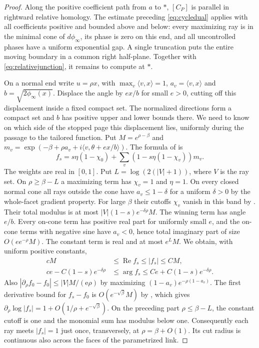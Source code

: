 \begin{proof}
Along the positive coefficient path from $a$ to $*$, $[C_P]$ is parallel in rightward relative homology. The estimate preceding \eqref{eq:cycledual} applies with all coefficients positive and bounded above and below: every maximizing ray is in the minimal cone of $d\phi_\infty$, its phase is zero on this end, and all uncontrolled phases have a uniform exponential gap. A single truncation puts the entire moving boundary in a common right half-plane. Together with \eqref{eq:relativejunction}, it remains to compute at $*$.

On a normal end write $u=\rho x$, with $\max_v\langle v,x\rangle=1$, $a_v=\langle v,x\rangle$ and $b=\sqrt{2\phi_\infty(x)}$. Displace the angle by $ex/b$ for small $e>0$, cutting off this displacement inside a fixed compact set. The normalized directions form a compact set and $b$ has positive upper and lower bounds there. We need to know on which side of the stopped page this displacement lies, uniformly during the passage to the tailored function. Put $M=e^{\rho-\beta}$ and $m_v=\exp(-\beta+\rho a_v+i\langle v,\theta+ex/b\rangle)$. The formula of \cite[M.6]{FHSZ} is
\[
             f_s=s\eta(1-\chi_0)+
                          \sum_v(1-s\eta(1-\chi_v))m_v .
\]
The weights are real in $[0,1]$. Put $L=\log(2(|V|+1))$, where $V$ is the ray set. On $\rho\ge\beta-L$ a maximizing term has $\chi_v=1$ and $\eta=1$. On every closed normal cone all rays outside the cone have $a_v\le1-\delta$ for a uniform $\delta>0$ by the whole-facet gradient property. For large $\beta$ their cutoffs $\chi_v$ vanish in this band by \cite[M.2 and T.5]{FHSZ}. Their total modulus is at most $|V|(1-s)e^{-\delta\rho}M$. The winning term has angle $e/b$. Every on-cone term has positive real part for uniformly small $e$, and the on-cone terms with negative sine have $a_v<0$, hence total imaginary part of size $O(e e^{-\rho}M)$. The constant term is real and at most $e^LM$. We obtain, with uniform positive constants,
\begin{align*}
 cM&\le\operatorname{Re} f_s\le |f_s|\le CM,\\
 ce-C(1-s)e^{-\delta\rho}&\le \arg f_s
                         \le Ce+C(1-s)e^{-\delta\rho}.
\end{align*}
Also $|\partial_\rho f_0-f_0|\le |V|M/(\mathrm e\rho)$ by maximizing $(1-a_v)e^{-\rho(1-a_v)}$. The first derivative bound for $f_s-f_0$ is $O(e^{-\sqrt\beta}M)$ by \cite[M.8]{FHSZ}, which gives $\partial_\rho\log |f_s|=1+O(1/\rho+e^{-\sqrt\beta})$. On the preceding part $\rho\le\beta-L$, the constant cutoff is one and the monomial sum has modulus below one. Consequently each ray meets $|f_s|=1$ just once, transversely, at $\rho=\beta+O(1)$. Its cut radius is continuous also across the faces of the parametrized link.


\end{proof}

